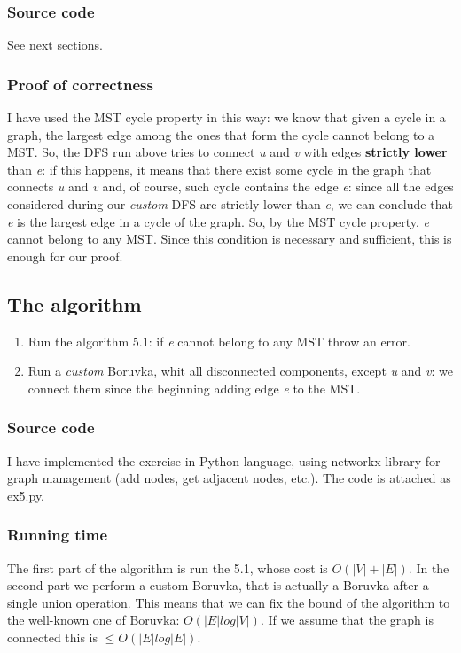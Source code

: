 \subsubsection{Source code}
See next sections.

\subsubsection{Proof of correctness}
I have used the MST cycle property in this way: we know that given a cycle in a graph, the largest edge among the ones that form the cycle cannot belong to a MST. So, the DFS run above tries to connect \textit{u} and \textit{v} with edges \textbf{strictly lower} than \textit{e}: if this happens, it means that there exist some cycle in the graph that connects \textit{u} and \textit{v} and, of course, such cycle contains the edge \textit{e}: since all the edges considered during our \textit{custom} DFS are strictly lower than \textit{e}, we can conclude that \textit{e} is the largest edge in a cycle of the graph. So, by the MST cycle property, \textit{e} cannot belong to any MST. Since this condition is necessary and sufficient, this is enough for our proof.

\subsection{The algorithm}
\begin{enumerate}
	\item Run the algorithm 5.1: if \textit{e} cannot belong to any MST throw an error.
	\item Run a \textit{custom} Boruvka, whit all disconnected components, except \textit{u} and \textit{v}: we connect them since the beginning adding edge \textit{e} to the MST.
\end{enumerate}

\subsubsection{Source code}
I have implemented the exercise in Python language, using networkx library for graph management (add nodes, get adjacent nodes, etc.). The code is attached as ex5.py.

\subsubsection{Running time}
The first part of the algorithm is run the 5.1, whose cost is $O(|V| + |E|)$. In the second part we perform a custom Boruvka, that is actually a Boruvka after a single union operation. This means that we can fix the bound of the algorithm to the well-known one of Boruvka: $O(|E| log|V|)$. If we assume that the graph is connected this is $\leq O(|E| log|E|)$.

